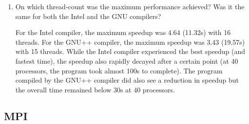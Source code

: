 \documentclass{article}
\begin{document}
\begin{enumerate}
	\item On which thread-count was the maximum performance achieved? Was it the same for both the Intel and the GNU compilers?

	For the Intel compiler, the maximum speedup was 4.64 (11.32s) with 16 threads. For the GNU++ compiler, the maximum speedup was 3.43 (19.57s) with 15 threads. While the Intel compiler experienced the best speedup (and fastest time), the speedup also rapidly decayed after a certain point (at 40 processors, the program took almost 100s to complete). The program compiled by the GNU++ compiler did also see a reduction in speedup but the overall time remained below 30s at 40 processors.

\end{enumerate}

\subsection{MPI}
\end{document}
